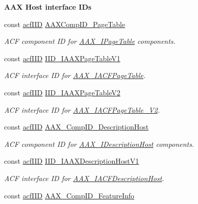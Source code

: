\begin{Indent}{\bf A\+A\+X Host interface I\+Ds}
\begin{DoxyCompactItemize}
const \hyperlink{a00150_a59df0b41744eee7a066787aaedf97f67}{acf\+I\+I\+D} \hyperlink{a00299_ab7a7eb58fd2e7fb243dd7deaf9416faa}{A\+A\+X\+Comp\+I\+D\+\_\+\+Page\+Table}
\begin{DoxyCompactList}\small\item\em A\+C\+F component I\+D for \hyperlink{a00107}{A\+A\+X\+\_\+\+I\+Page\+Table} components. \end{DoxyCompactList}\item 
const \hyperlink{a00150_a59df0b41744eee7a066787aaedf97f67}{acf\+I\+I\+D} \hyperlink{a00299_a04d4f5570116d51b5ac4b0d4f660e7ea}{I\+I\+D\+\_\+\+I\+A\+A\+X\+Page\+Table\+V1}
\begin{DoxyCompactList}\small\item\em A\+C\+F interface I\+D for \hyperlink{a00074}{A\+A\+X\+\_\+\+I\+A\+C\+F\+Page\+Table}. \end{DoxyCompactList}\item 
const \hyperlink{a00150_a59df0b41744eee7a066787aaedf97f67}{acf\+I\+I\+D} \hyperlink{a00299_a028bd21ca7e74fcb2dc4587219be8721}{I\+I\+D\+\_\+\+I\+A\+A\+X\+Page\+Table\+V2}
\begin{DoxyCompactList}\small\item\em A\+C\+F interface I\+D for \hyperlink{a00075}{A\+A\+X\+\_\+\+I\+A\+C\+F\+Page\+Table\+\_\+\+V2}. \end{DoxyCompactList}\item 
const \hyperlink{a00150_a59df0b41744eee7a066787aaedf97f67}{acf\+I\+I\+D} \hyperlink{a00299_a9a13fa824d749a47cab7e7d9f7482600}{A\+A\+X\+\_\+\+Comp\+I\+D\+\_\+\+Description\+Host}
\begin{DoxyCompactList}\small\item\em A\+C\+F component I\+D for \hyperlink{a00091}{A\+A\+X\+\_\+\+I\+Description\+Host} components. \end{DoxyCompactList}\item 
const \hyperlink{a00150_a59df0b41744eee7a066787aaedf97f67}{acf\+I\+I\+D} \hyperlink{a00299_a1ffea676bbcfc48ac90e39ea2c2a735b}{I\+I\+D\+\_\+\+I\+A\+A\+X\+Description\+Host\+V1}
\begin{DoxyCompactList}\small\item\em A\+C\+F interface I\+D for \hyperlink{a00056}{A\+A\+X\+\_\+\+I\+A\+C\+F\+Description\+Host}. \end{DoxyCompactList}\item 
const \hyperlink{a00150_a59df0b41744eee7a066787aaedf97f67}{acf\+I\+I\+D} \hyperlink{a00299_aae0f0aac0bf016668407259eb98a0c81}{A\+A\+X\+\_\+\+Comp\+I\+D\+\_\+\+Feature\+Info}

\end{DoxyCompactItemize}
\end{Indent}
